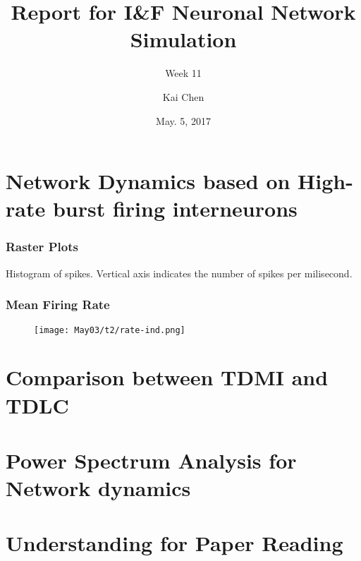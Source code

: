 \documentclass{beamer}
\title{Report for I\&F Neuronal Network Simulation}
\subtitle{Week 11}
\author{Kai Chen}
\date{May. 5, 2017}
\begin{document}
\frame{\titlepage}

\section{Network Dynamics based on High-rate burst firing interneurons}

\begin{frame}
  \frametitle{Raster Plots}
  \begin{figure}[h]
    \centering
  \end{figure}
  \scriptsize{Histogram of spikes. Vertical axis indicates the number of spikes per milisecond.}
\end{frame}

\begin{frame}
  \frametitle{Mean Firing Rate}
  \begin{figure}[h]
    \centering
    \texttt{[image: May03/t2/rate-ind.png]}
  \end{figure}
\end{frame}

\section{Comparison between TDMI and TDLC}

\section{Power Spectrum Analysis for Network dynamics}

\section{Understanding for Paper Reading}
\end{document}
